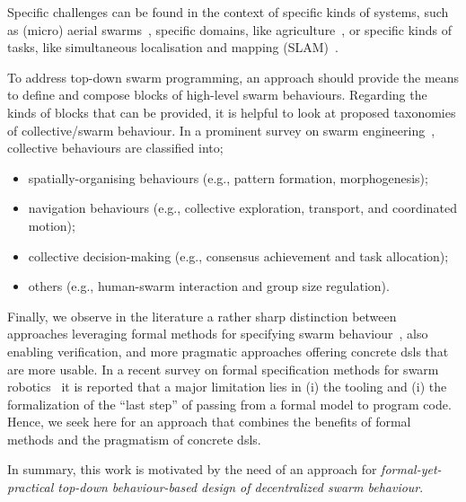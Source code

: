 Specific challenges can be found in the context of 
specific kinds of systems,
such as (micro) aerial swarms~\cite{Abdelkader2021aerialswarms,%
Coppola2020microairswarms},
specific domains,
like agriculture~\cite{DBLP:journals/cea/AlbieroGUP22},
or specific kinds of tasks,
like simultaneous localisation and mapping (SLAM)~\cite{Kegeleirs2021slam}.


To address %
 top-down swarm programming,
 an approach should provide
 the means to define and compose 
 blocks of high-level swarm behaviours.%
%
Regarding the kinds of blocks that can be provided,
 it is helpful to look at proposed taxonomies of collective/swarm behaviour.
%
In a prominent survey on swarm engineering~\cite{DBLP:journals/swarm/BrambillaFBD13},
 collective behaviours are classified into;
\begin{itemize}
  \item spatially-organising behaviours (e.g., pattern formation, morphogenesis);
  \item navigation behaviours (e.g., collective exploration, transport, and coordinated motion);
  \item collective decision-making (e.g., consensus achievement and task allocation);
  \item others (e.g., human-swarm interaction and group size regulation).
\end{itemize} 
Finally, we observe in the literature 
 a rather sharp distinction
 between approaches leveraging
 formal methods for specifying swarm behaviour~\cite{DBLP:journals/csur/LuckcuckFDDF19},
 also enabling verification,
 and more pragmatic approaches
 offering concrete \acp{dsl} 
 that are more usable.
%
In a recent survey on formal specification methods for swarm robotics~\cite{DBLP:journals/csur/LuckcuckFDDF19}
 it is reported that a major limitation lies in (i) the tooling and (i) the formalization of the ``last step'' of passing from a formal model to program code.
%
Hence, we seek here for an approach that combines the benefits of formal methods and the pragmatism of concrete \acp{dsl}.

In summary,
 this work is motivated by the need of an
 approach for \emph{formal-yet-practical top-down behaviour-based design of decentralized swarm behaviour}.

